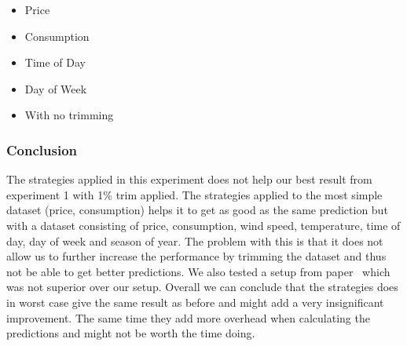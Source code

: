\begin{itemize}
	\item Price
	\item Consumption
	\item Time of Day
	\item Day of Week
	\item With no trimming
\end{itemize}
\begin{table}[H]
\centering  %
\caption{Scatter text~\cite{singhal2011electricity} with other statistical features and 1\% trim} %
\label{table:scatter_text_1p_trim} %
\end{table}

\subsubsection{Conclusion}
The strategies applied in this experiment does not help our best result from experiment 1 with 1\% trim applied. The strategies applied to the most simple dataset (price, consumption) helps it to get as good as the same prediction but with a dataset consisting of price, consumption, wind speed, temperature, time of day, day of week and season of year. The problem with this is that it does not allow us to further increase the performance by trimming the dataset and thus not be able to get better predictions. We also tested a setup from paper~\cite{singhal2011electricity} which was not superior over our setup. Overall we can conclude that the strategies does in worst case give the same result as before and might add a very insignificant improvement. The same time they add more overhead when calculating the predictions and might not be worth the time doing.

